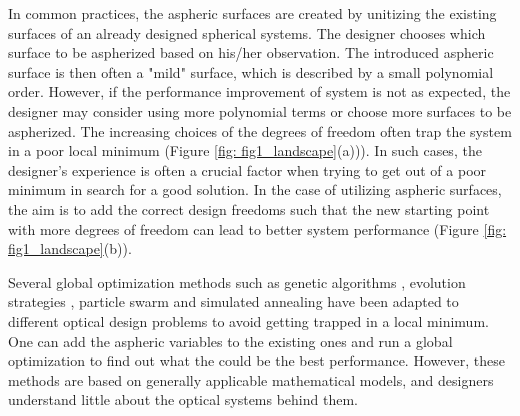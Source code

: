In common practices, the aspheric surfaces are created by unitizing the existing surfaces of an already designed spherical systems. The designer chooses which surface to be aspherized based on his/her observation. The introduced aspheric surface is then often a "mild" surface, which is described by a small polynomial order. However, if the performance improvement of system is not as expected, the designer may consider using more polynomial terms or choose more surfaces to be aspherized. The increasing choices of the degrees of freedom often trap the system in a poor local minimum (Figure \ref{fig: fig1_landscape}(a))). In such cases, the designer's experience is often a crucial factor when trying to get out of a poor minimum in search for a good solution. In the case of utilizing aspheric surfaces, the aim is to add the correct design freedoms such that the new starting point with more degrees of freedom can lead to better system performance (Figure \ref{fig: fig1_landscape}(b)). %


Several global optimization methods such as genetic algorithms \cite{Moore1999}, evolution strategies \cite{Nagar:18}, particle swarm \cite{MenkeParticleSwarm} and simulated annealing \cite{Forbes1991} have been adapted to different optical design problems to avoid getting trapped in a local minimum. One can add the aspheric variables to the existing ones and run a global optimization to find out what the could be the best performance. However, these methods are based on generally applicable mathematical models, and designers understand little about the optical systems behind them. 
 
